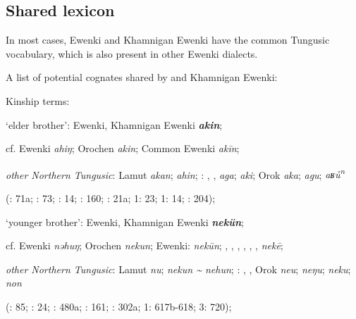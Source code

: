 \documentclass[output=paper,colorlinks,citecolor=brown]{langscibook}
\begin{document}
\subsection{Shared lexicon}

In most cases,  Ewenki and Khamnigan Ewenki have the common Tungusic vocabulary, which is also present in other Ewenki dialects.

\ea
A list of potential cognates shared by  and Khamnigan Ewenki:

\begin{xlist}
    \ex Kinship terms:

\begin{xlist}
    \ex ‘elder brother’:  Ewenki, Khamnigan Ewenki \textbf{\textit{akin}};

    cf.  Ewenki \textit{ahiŋ}; Orochen \textit{akin};  Common Ewenki \textit{akīn};

    \textit{other Northern Tungusic}: Lamut \textit{akan};  \textit{ahin}; \textit{}: , ,  \textit{aga};  \textit{aki}; Orok \textit{aka};  \textit{agu};  \textit{aʁů\textsuperscript{n}} 
    
    (\citealt{Castrén1856}: 71a; \citealt{Janhunen1991}: 73; \citealt{Dorji1998}: 14; \citealt{Chaoke2014a}: 160; \citealt{Vasilevic1958}: 21a; \citealt{Cincius1975B} 1: 23; \citealt{Hauer1952} 1: 14; \citealt{Zikmundová2013a}: 204);


    \ex ‘younger brother’:  Ewenki, Khamnigan Ewenki \textbf{\textit{nekün}};
    
    cf.  Ewenki \textit{nǝhuŋ}; Orochen \textit{nekun};  Ewenki:  \textit{nekūn}; , , , , , ,  \textit{nekē};

    \textit{other Northern Tungusic}: Lamut \textit{nu};  \textit{nekun {\textasciitilde} nehun}; \textit{}: , , Orok \textit{neu};  \textit{neŋu};  \textit{neku};  \textit{non}
    
    (\citealt{Castrén1856}: 85; \citealt{Janhunen1991}: 24; \citealt{Dorji1998}: 480a; \citealt{Chaoke2014a}: 161; \citealt{Vasilevic1958}: 302a; \citealt{Cincius1975B} 1: 617b-618; \citealt{Hauer1952} 3: 720); 



\end{xlist}
\end{xlist}
\end{document}
